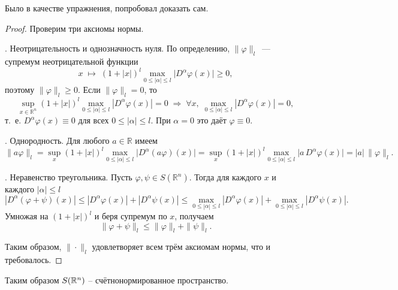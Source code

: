 \begin{note}
Было в качестве упражнения, попробовал доказать сам.
\end{note}

\begin{proof}
Проверим три аксиомы нормы.

\medskip
{}. Неотрицательность и однозначность нуля.
По определению, \(\|\varphi\|_l\)~--- супремум неотрицательной функции
\[
x\;\mapsto\;(1+|x|)^l \max_{0 \le |\alpha|\le l}\bigl|D^\alpha\varphi(x)\bigr|\ge0,
\]
поэтому \(\|\varphi\|_l\ge0\). Если \(\|\varphi\|_l=0\), то
\[
\sup_{x\in\mathbb{R}^n}(1+|x|)^l\max_{0 \le |\alpha|\le l}|D^\alpha\varphi(x)|=0
\;\Longrightarrow\;
\forall x,\;\max_{0 \le |\alpha|\le l}|D^\alpha\varphi(x)|=0,
\]
т.~е. \(D^\alpha\varphi(x)\equiv0\) для всех \(0 \le |\alpha|\le l\). При \(\alpha=0\) это даёт \(\varphi\equiv0\).

\medskip
{}. Однородность.
Для любого \(a\in\mathbb{R}\) имеем
\[
\|a\varphi\|_l
=\sup_x(1+|x|)^l\max_{0 \le |\alpha|\le l}\bigl|D^\alpha(a\varphi)(x)\bigr|
=\sup_x(1+|x|)^l\max_{0 \le |\alpha|\le l}\bigl|a\,D^\alpha\varphi(x)\bigr|
=|a|\,\|\varphi\|_l.
\]

\medskip
{}. Неравенство треугольника.
Пусть \(\varphi,\psi\in S(\mathbb{R}^n)\). Тогда для каждого \(x\) и каждого \(|\alpha|\le l\)
\[
|D^\alpha(\varphi+\psi)(x)|
\le|D^\alpha\varphi(x)|+|D^\alpha\psi(x)|
\le\max_{0 \le |\alpha|\le l}|D^\alpha\varphi(x)|+\max_{0 \le |\alpha|\le l}|D^\alpha\psi(x)|.
\]
Умножая на \((1+|x|)^l\) и беря супремум по \(x\), получаем
\[
\|\varphi+\psi\|_l
\le\|\varphi\|_l+\|\psi\|_l.
\]

Таким образом, \(\|\cdot\|_l\) удовлетворяет всем трём аксиомам нормы, что и требовалось.
\end{proof}
\begin{note}
    Таким образом $S(\mathbb{R}^n)$ -- счётнонормированное пространство.
\end{note}

